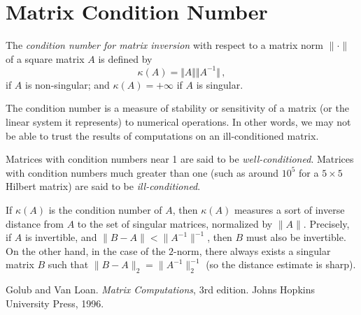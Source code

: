 \documentclass[12pt]{article}
\providecommand{\norm}[1]{\lVert#1\rVert}
\begin{document}
\section{Matrix Condition Number}

The \emph{condition number for matrix inversion} with respect to a matrix norm
$\norm{\cdot}$ of a square matrix $A$ is defined by
\[
\kappa(A) = \Vert A \Vert \Vert A^{-1} \Vert\,,
\]
if $A$ is non-singular; and $\kappa(A) = +\infty$ if $A$ is singular.

The condition number is a measure of stability or sensitivity of a matrix (or the linear system it represents) to numerical operations. In other words, we may not be able to trust the results of computations on an ill-conditioned matrix.

Matrices with condition numbers near 1 are said to be \emph{well-conditioned}.  Matrices with condition numbers much greater than one (such as around $10^5$ for  a $5 \times 5$ Hilbert matrix) are said to be \emph{ill-conditioned}.  

If $\kappa(A)$ is the condition number of $A$, then $\kappa(A)$ measures 
a sort of inverse distance from $A$ to the set of singular matrices,
normalized by $\norm{A}$.
Precisely, if $A$ is invertible, and $\norm{B - A} < \norm{A^{-1}}^{-1}$,
then $B$ must also be invertible.  On the other hand, in the case of the $2$-norm,
there always exists a singular matrix $B$ such that $\norm{B-A}_2 = \norm{A^{-1}}_2^{-1}$
(so the distance estimate is sharp).

\begin{thebibliography}{3}
 Golub and Van Loan. \emph{Matrix Computations}, 3rd edition. Johns Hopkins University Press, 1996.
\end{thebibliography}
\end{document}

